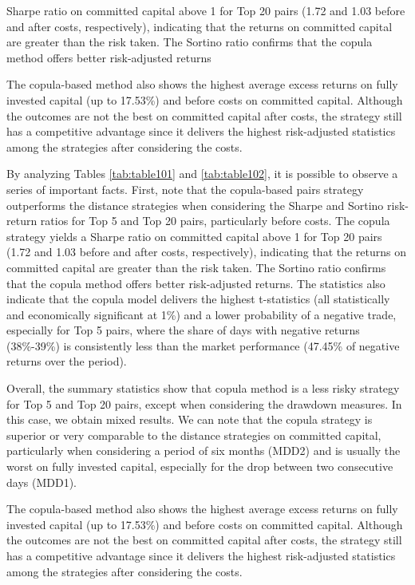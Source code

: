 \documentclass[a4paper]{article}
\begin{document}
  Sharpe ratio on committed capital above 1 for Top 20 pairs (1.72 and 1.03 before and after costs, respectively), indicating that the returns on committed capital are greater than the risk taken. The Sortino ratio confirms that the copula method offers better risk-adjusted returns

The copula-based method also shows the highest average excess returns on fully invested capital (up to 17.53\%) and before costs on committed capital. Although the outcomes are not the best on committed capital after costs, the strategy still has a competitive advantage since it delivers the highest risk-adjusted statistics among the strategies after considering the costs.
	
By analyzing Tables \ref{tab:table101} and \ref{tab:table102}, it is possible to observe a series of important facts. First, note that the copula-based pairs strategy outperforms the distance strategies when considering the Sharpe and Sortino risk-return ratios for Top 5 and Top 20 pairs, particularly before costs. The copula strategy yields a Sharpe ratio on committed capital above 1 for Top 20 pairs (1.72 and 1.03 before and after costs, respectively), indicating that the returns on committed capital are greater than the risk taken. The Sortino ratio confirms that the copula method offers better risk-adjusted returns. The statistics also indicate that the copula model delivers the highest t-statistics (all statistically and economically significant at 1\%) and a lower probability of a negative trade, especially for Top 5 pairs, where the share of days with negative returns (38\%-39\%) is consistently less than the market performance (47.45\% of negative returns over the period).

Overall, the summary statistics show that copula method is a less risky strategy for Top 5 and Top 20 pairs, except when considering the drawdown measures. In this case, we obtain mixed results. We can note that the copula strategy is superior or very comparable to the distance strategies on committed capital, particularly when considering a period of six months (MDD2) and is usually the worst on fully invested capital, especially for the drop between two consecutive days (MDD1).

The copula-based method also shows the highest average excess returns on fully invested capital (up to 17.53\%) and before costs on committed capital. Although the outcomes are not the best on committed capital after costs, the strategy still has a competitive advantage since it delivers the highest risk-adjusted statistics among the strategies after considering the costs.
\end{document}
